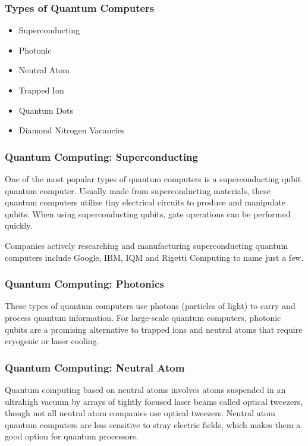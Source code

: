 \documentclass{beamer}
\begin{document}
\begin{frame}\frametitle{Types of Quantum Computers}
\begin{itemize}
\item Superconducting
\item Photonic
\item Neutral Atom
\item Trapped Ion
\item Quantum Dots
\item Diamond Nitrogen Vacancies
\end{itemize}
\end{frame}

\begin{frame}\frametitle{Quantum Computing: Superconducting}
One of the most popular types of quantum computers is a superconducting qubit quantum computer. Usually made from superconducting materials, these quantum computers utilize tiny electrical circuits to produce and manipulate qubits. When using superconducting qubits, gate operations can be performed quickly.

Companies actively researching and manufacturing superconducting quantum computers include Google, IBM, IQM and Rigetti Computing to name just a few.
\end{frame}


\begin{frame}\frametitle{Quantum Computing: Photonics}
These types of quantum computers use photons (particles of light) to carry and process quantum information. For large-scale quantum computers, photonic qubits are a promising alternative to trapped ions and neutral atoms that require cryogenic or laser cooling.
\end{frame}


\begin{frame}\frametitle{Quantum Computing: Neutral Atom}
Quantum computing based on neutral atoms involves atoms suspended in an ultrahigh vacuum by arrays of tightly focused laser beams called optical tweezers, though not all neutral atom companies use optical tweezers. Neutral atom quantum computers are less sensitive to stray electric fields, which makes them a good option for quantum processors.
\end{frame}
\end{document}
